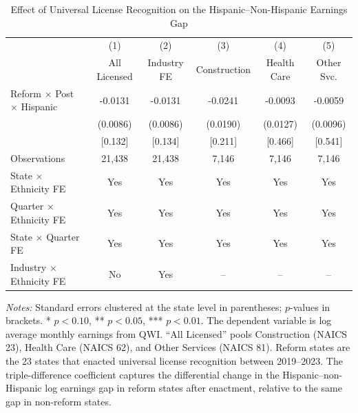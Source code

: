 \begin{table}[H]
\centering
\caption{Effect of Universal License Recognition on the Hispanic--Non-Hispanic Earnings Gap}
\label{tab:main}
\begin{threeparttable}
\footnotesize
\begin{tabular}{lccccc}
\toprule
 & (1) & (2) & (3) & (4) & (5) \\
 & All Licensed & Industry FE & Construction & Health Care & Other Svc. \\
\midrule
Reform $\times$ Post $\times$ Hispanic & -0.0131 & -0.0131 & -0.0241 & -0.0093 & -0.0059 \\
 & (0.0086) & (0.0086) & (0.0190) & (0.0127) & (0.0096) \\
 & [0.132] & [0.134] & [0.211] & [0.466] & [0.541] \\
\midrule
Observations & 21,438 & 21,438 & 7,146 & 7,146 & 7,146 \\
State $\times$ Ethnicity FE & Yes & Yes & Yes & Yes & Yes \\
Quarter $\times$ Ethnicity FE & Yes & Yes & Yes & Yes & Yes \\
State $\times$ Quarter FE & Yes & Yes & Yes & Yes & Yes \\
Industry $\times$ Ethnicity FE & No & Yes & -- & -- & -- \\
\bottomrule
\end{tabular}
\begin{tablenotes}[flushleft]
\small
\item \textit{Notes:} Standard errors clustered at the state level in parentheses; $p$-values in brackets. * $p<0.10$, ** $p<0.05$, *** $p<0.01$. The dependent variable is log average monthly earnings from QWI. ``All Licensed'' pools Construction (NAICS 23), Health Care (NAICS 62), and Other Services (NAICS 81). Reform states are the 23 states that enacted universal license recognition between 2019--2023. The triple-difference coefficient captures the differential change in the Hispanic--non-Hispanic log earnings gap in reform states after enactment, relative to the same gap in non-reform states.
\end{tablenotes}
\end{threeparttable}
\end{table}

